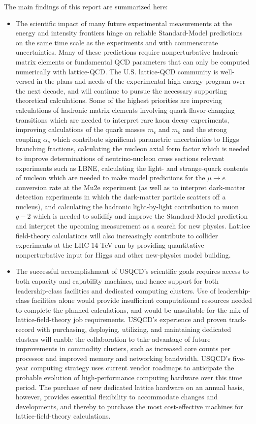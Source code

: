 The main findings of this report are summarized here:

\begin{itemize}

\item The scientific impact of many future experimental measurements at the energy and intensity frontiers hinge on reliable Standard-Model predictions on the same time
scale as the experiments and with commensurate uncertainties. Many of these predictions require nonperturbative hadronic matrix elements or fundamental QCD parameters that can only be computed numerically with lattice-QCD. The U.S. lattice-QCD community is well-versed in the plans and needs of the experimental high-energy program
over the next decade, and will continue to pursue the necessary supporting theoretical calculations.   Some of the highest priorities are improving calculations of hadronic matrix elements involving quark-flavor-changing transitions which are needed to interpret rare kaon decay experiments, improving calculations of the quark masses $m_c$ and $m_b$ and the strong coupling $\alpha_s$ which contribute significant parametric uncertainties to Higgs branching fractions, calculating the nucleon axial form factor which is needed to improve determinations of neutrino-nucleon cross sections relevant experiments such as LBNE, calculating the light- and strange-quark contents of nucleon which are needed to make model predictions for the $\mu \to e$ conversion rate at the Mu2e experiment (as well as to interpret dark-matter detection experiments in which
the dark-matter particle scatters off a nucleus), and calculating the hadronic light-by-light contribution to muon $g-2$ which is needed to solidify and improve the Standard-Model prediction and interpret the upcoming measurement as a search for new physics.  Lattice field-theory calculations will also increasingly contribute to collider experiments at the LHC 14-TeV run by providing quantitative nonperturbative input for Higgs and other new-physics model building.

\item The successful accomplishment of USQCD's scientific goals requires access to both capacity and capability machines, and hence support for both leadership-class facilities and dedicated computing clusters.  Use of leadership-class facilities alone would provide insufficient computational resources needed to complete the planned calculations, and would be unsuitable for the mix of lattice-field-theory job requirements.   USQCD's experience and proven track-record with purchasing, deploying, utilizing, and maintaining dedicated clusters will enable the collaboration to take advantage of future improvements in commodity clusters, such as increased core counts per processor and improved memory and networking bandwidth.   USQCD's five-year computing strategy uses current vendor roadmaps to anticipate the probable evolution of high-performance computing hardware over this time period.  The purchase of new dedicated lattice hardware on an annual basis, however, provides essential flexibility to accommodate changes and developments, and thereby to purchase the most cost-effective machines for lattice-field-theory calculations.


\end{itemize}
